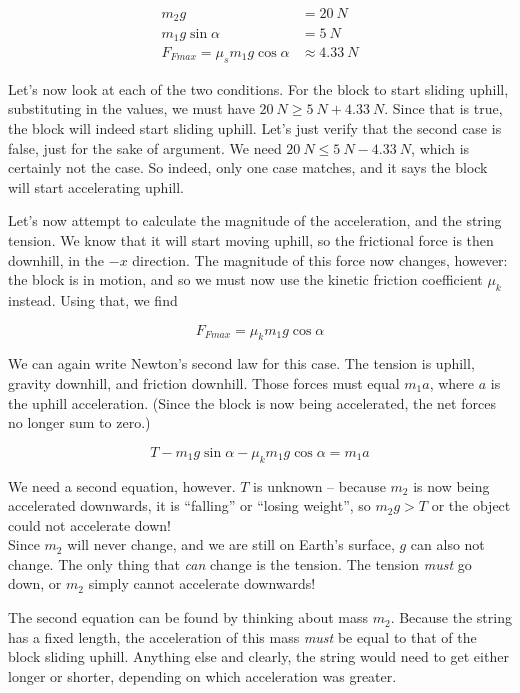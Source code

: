\documentclass[12pt,a4paper]{report}
\begin{document}
\begin{align}
m_2 g &= \SI{20}{N}\\
m_1 g \sin \alpha &= \SI{5}{N}\\
F_{Fmax} = \mu_s m_1 g \cos \alpha &\approx \SI{4.33}{N}
\end{align}

Let's now look at each of the two conditions. For the block to start sliding uphill, substituting in the values, we must have $\SI{20}{N} \ge \SI{5}{N} + \SI{4.33}{N}$. Since that is true, the block will indeed start sliding uphill. Let's just verify that the second case is false, just for the sake of argument. We need $\SI{20}{N} \le \SI{5}{N} - \SI{4.33}{N}$, which is certainly not the case. So indeed, only one case matches, and it says the block will start accelerating uphill.

Let's now attempt to calculate the magnitude of the acceleration, and the string tension. We know that it will start moving uphill, so the frictional force is then downhill, in the $-x$ direction. The magnitude of this force now changes, however: the block is in motion, and so we must now use the kinetic friction coefficient $\mu_k$ instead. Using that, we find

\begin{equation}
F_{Fmax} = \mu_k m_1 g \cos \alpha
\end{equation}

We can again write Newton's second law for this case. The tension is uphill, gravity downhill, and friction downhill. Those forces must equal $m_1 a$, where $a$ is the uphill acceleration. (Since the block is now being accelerated, the net forces no longer sum to zero.)

\begin{equation}
T - m_1 g \sin \alpha - \mu_k m_1 g \cos \alpha = m_1 a
\end{equation}

We need a second equation, however. $T$ is unknown -- because $m_2$ is now being accelerated downwards, it is ``falling'' or ``losing weight'', so $m_2 g > T$ or the object could not accelerate down!\\
Since $m_2$ will never change, and we are still on Earth's surface, $g$ can also not change. The only thing that \emph{can} change is the tension. The tension \emph{must} go down, or $m_2$ simply cannot accelerate downwards!

The second equation can be found by thinking about mass $m_2$. Because the string has a fixed length, the acceleration of this mass \emph{must} be equal to that of the block sliding uphill. Anything else and clearly, the string would need to get either longer or shorter, depending on which acceleration was greater.
\end{document}
